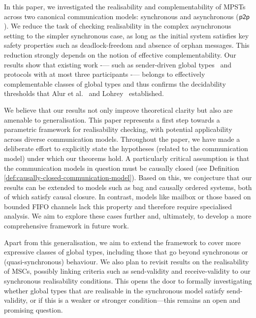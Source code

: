 
In this paper, we investigated the realisability and complementability of MPSTs across two canonical communication models: synchronous and asynchronous ($\mathsf{p2p}$). 
We reduce the task of checking realisability in the complex asynchronous setting to the simpler synchronous case, as long as the initial system satisfies key safety properties such as deadlock-freedom and absence of orphan messages.
This reduction strongly depends on the notion of effective complementability. 
Our results show that existing work -— such as sender-driven global types~\cite{DBLP:conf/cav/LiSWZ23} and protocols with at most three participants -— belongs to effectively complementable classes of global types and thus confirms the decidability thresholds that Alur et al.~\cite{DBLP:journals/tcs/AlurEY05} and Lohrey~\cite{DBLP:journals/tcs/Lohrey03} established.

We believe that our results not only improve theoretical clarity but also are amenable to generalisation. This paper represents a first step towards a parametric framework for realisability checking, with potential applicability across diverse communication models. Throughout the paper, we have made a deliberate effort to explicitly state the hypotheses (related to the communication model) under which our theorems hold. 
A particularly critical assumption is that the communication models in question must be causally closed (see Definition \ref{def:causally-closed-communication-model}). Based on this, we conjecture that our results can be extended to models such as bag and causally ordered systems, both of which satisfy causal closure. In contrast, models like mailbox  or those based on bounded FIFO channels lack this property and therefore require specialised analysis. We aim to explore these cases further and, ultimately, to develop a more comprehensive framework in future work.

Apart from this generalisation,  we aim to extend the framework to cover more expressive classes of global types, including those that go beyond synchronous or (quasi-synchronous) behaviour. We also plan to revisit results on the realisability of MSCs, possibly linking criteria such as send-validity and receive-validity \cite{DBLP:conf/cav/LiSWZ23,DBLP:conf/ecoop/Stutz23} to our synchronous realisability conditions. This opens the door to formally investigating whether global types that are realisable in the synchronous model satisfy send-validity, or if this is a weaker or stronger condition—this remains an open and promising question.


